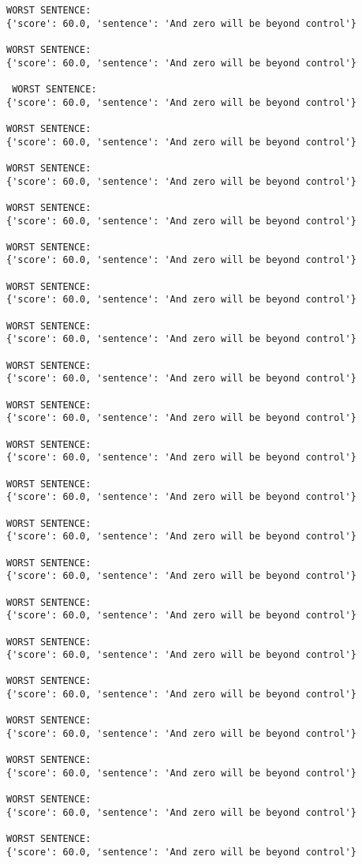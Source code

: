 \documentclass[12pt,a4paper,oneside]{book}
\begin{document}
\begin{verbatim}
WORST SENTENCE:
{'score': 60.0, 'sentence': 'And zero will be beyond control'}

WORST SENTENCE:
{'score': 60.0, 'sentence': 'And zero will be beyond control'}

 WORST SENTENCE:
{'score': 60.0, 'sentence': 'And zero will be beyond control'}

WORST SENTENCE:
{'score': 60.0, 'sentence': 'And zero will be beyond control'}

WORST SENTENCE:
{'score': 60.0, 'sentence': 'And zero will be beyond control'}

WORST SENTENCE:
{'score': 60.0, 'sentence': 'And zero will be beyond control'}

WORST SENTENCE:
{'score': 60.0, 'sentence': 'And zero will be beyond control'}

WORST SENTENCE:
{'score': 60.0, 'sentence': 'And zero will be beyond control'}

WORST SENTENCE:
{'score': 60.0, 'sentence': 'And zero will be beyond control'}

WORST SENTENCE:
{'score': 60.0, 'sentence': 'And zero will be beyond control'}

WORST SENTENCE:
{'score': 60.0, 'sentence': 'And zero will be beyond control'}

WORST SENTENCE:
{'score': 60.0, 'sentence': 'And zero will be beyond control'}

WORST SENTENCE:
{'score': 60.0, 'sentence': 'And zero will be beyond control'}

WORST SENTENCE:
{'score': 60.0, 'sentence': 'And zero will be beyond control'}

WORST SENTENCE:
{'score': 60.0, 'sentence': 'And zero will be beyond control'}

WORST SENTENCE:
{'score': 60.0, 'sentence': 'And zero will be beyond control'}

WORST SENTENCE:
{'score': 60.0, 'sentence': 'And zero will be beyond control'}

WORST SENTENCE:
{'score': 60.0, 'sentence': 'And zero will be beyond control'}

WORST SENTENCE:
{'score': 60.0, 'sentence': 'And zero will be beyond control'}

WORST SENTENCE:
{'score': 60.0, 'sentence': 'And zero will be beyond control'}

WORST SENTENCE:
{'score': 60.0, 'sentence': 'And zero will be beyond control'}

WORST SENTENCE:
{'score': 60.0, 'sentence': 'And zero will be beyond control'}


\end{verbatim}
\end{document}
